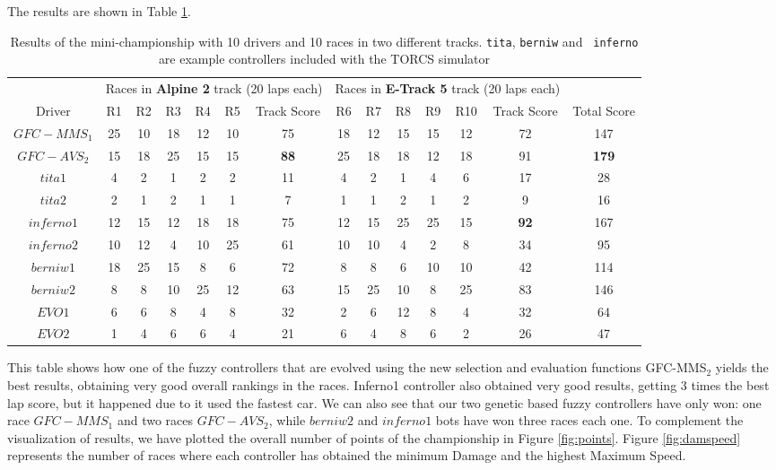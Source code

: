 \documentclass[conference]{IEEEtran}
\begin{document}
The results are shown in Table \ref{tab:chsresults}. 
%
\begin{table}[ht]
  \centering
  {\scriptsize
    \caption{ Results of the mini-championship with 10 drivers and 10
      races in two different tracks. {\tt tita}, {\tt berniw} and {\tt
      inferno} are example controllers included with the TORCS
    simulator \cite{torcs4}}
    {
			\begin{tabular}{|c||c|c|c|c|c|c||c|c|c|c|c|c||c|}
				\hline
			&\multicolumn{6}{|c|}{Races in \textbf{Alpine 2} track (20 laps each)} &	\multicolumn{6}{|c|}{Races in \textbf{E-Track 5} track (20 laps each)}&\\
					\cline{2-13}
				Driver&{R1}&{R2}&{R3}&{R4}&{R5}&Track Score&{R6}&{R7}&{R8}& {R9}&{R10}&Track Score& Total Score\\
				\hline
				$GFC-MMS_1$&	25&	10&	18&	12&	10&75&	18&	12&	15&	15&	12&72&147\\
				$GFC-AVS_2$&	15&	18&	25&	15&	15&\textbf{88}&	25&	18&	18&	12&18&91&\textbf{179}\\
				$tita1$&	4&	2&	1&	2&	2&11&	4&	2&	1&	4&	6&17&28\\
				$tita2$&	2&	1&	2&	1&	1&7&	1&	1&	2&	1&	2&9&16\\
				$inferno1$&12&15&	12&	18&	18&75&	12&	15&	25&	25&	15&\textbf{92}&167\\
				$inferno2$&10&12&	4&	10&	25&61&	10&	10&	4&	2&	8&34&95\\
				$berniw1$&	18&	25&	15&	8&	6&72&	8&	8&	6&	10&	10&42&114\\
				$berniw2$	&8&	8&	10&	25&	12&63&	15&	25&	10&	8&	25&83&146\\
				$EVO1$&	6&	6&	8&	4&	8&32&	2&	6&	12&	8&	4&32&64\\
				$EVO2$&	1&	4&	6&	6&	4&21&	6&	4&	8&	6&	2&26&47\\
				\hline
				
			\end{tabular}
		}\label{tab:chsresults}
	}
\end{table}
%
This table shows how one of the fuzzy controllers that are evolved using the
new selection and evaluation functions {\sf GFC-MMS$_2$} yields the best results, obtaining very good overall rankings in the races. Inferno1 controller also obtained very good results, getting 3 times the best lap score, but it happened due to it used the fastest car.
%
We can also see that our two genetic based fuzzy controllers have only won: one race $GFC-MMS_1$ and two races $GFC-AVS_2$, while $berniw2$ and $inferno1$ bots have won three races each one. 
To complement the visualization of results, we have plotted the overall number of points of the championship in Figure \ref{fig:points}. Figure \ref{fig:damspeed} represents the number of races where each controller has obtained the minimum Damage and the highest Maximum Speed.
\end{document}
